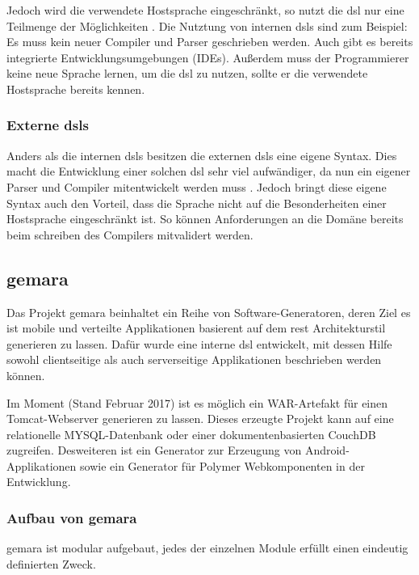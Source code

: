 Jedoch wird die verwendete Hostsprache eingeschränkt, so nutzt die \acl{dsl} nur eine Teilmenge der Möglichkeiten \cite{dsl}. Die Nutztung von internen \acsp{dsl} sind zum Beispiel: Es muss kein neuer Compiler und Parser geschrieben werden. Auch gibt es bereits integrierte Entwicklungsumgebungen (IDEs). Außerdem muss der Programmierer keine neue Sprache lernen, um die \acl{dsl} zu nutzen, sollte er die verwendete Hostsprache bereits kennen. 

\subsubsection{Externe \acsp{dsl}} \label{sec:extern}

Anders als die internen \acsp{dsl} besitzen die externen \acsp{dsl} eine eigene Syntax. Dies macht die Entwicklung einer solchen \acl{dsl} sehr viel aufwändiger, da nun ein eigener Parser und Compiler mitentwickelt werden muss \cite{dsl}. Jedoch bringt diese eigene Syntax auch den Vorteil, dass die Sprache nicht auf die Besonderheiten einer Hostsprache eingeschränkt ist. So können Anforderungen an die Domäne bereits beim schreiben des Compilers mitvalidert werden.

\subsection{\acf{gemara}}\label{sec:gemara}

Das Projekt \acs{gemara} beinhaltet ein Reihe von Software-Generatoren, deren Ziel es ist mobile und verteilte Applikationen basierent auf dem \acs{rest} Architekturstil generieren zu lassen. Dafür wurde eine interne \acs{dsl} entwickelt, mit dessen Hilfe sowohl clientseitige als auch serverseitige Applikationen beschrieben werden können.

Im Moment (Stand Februar 2017) ist es möglich ein WAR-Artefakt für einen Tomcat-Webserver generieren zu lassen. Dieses erzeugte Projekt kann auf eine relationelle MYSQL-Datenbank oder einer dokumentenbasierten CouchDB zugreifen. Desweiteren ist ein Generator zur Erzeugung von Android-Applikationen sowie ein Generator für Polymer Webkomponenten in der Entwicklung.

\subsubsection{Aufbau von \acs{gemara}}

\acs{gemara} ist modular aufgebaut, jedes der einzelnen Module erfüllt einen eindeutig definierten Zweck.

